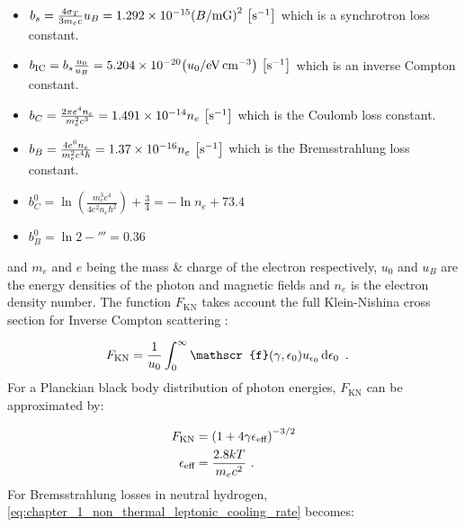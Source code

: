 \begin{itemize}[noitemsep]
	\item $b_s=\frac{4\sigma_T}{3m_ec}u_B=1.292\times 10^{-15}\qty(B/\si{\milli G})^2~\qty[\persec]$ which is a synchrotron loss constant.
	\item $b_\text{IC}=b_s\frac{u_0}{u_B}=5.204\times 10^{-20}\qty(u_0/\si{\electronvolt\per\centi\meter\cubed})~\qty[\persec]$ which is an inverse Compton constant.
	\item $b_C=\frac{2\pi e^4 n_e}{m_e^2 c^3}=1.491\times 10^{-14}n_e~\qty[\persec]$ which is the Coulomb loss constant.
	\item $b_B=\frac{4e^6 n_e}{m_e^2c^4\hbar}=1.37\times 10^{-16}n_e~\qty[\persec]$ which is the Bremsstrahlung loss constant.
	\item $b_C^0=\ln(\frac{m_e^3c^4}{4e^2n_e\hbar^2})+\frac{3}{4}=-\ln n_e+73.4$
	\item $b_B^0=\ln 2-\third=0.36$
\end{itemize}
\noindent and $m_e$ and $e$ being the mass \& charge of the electron respectively, $u_0$ and $u_B$ are the energy densities of the photon and magnetic fields and $n_e$ is the electron density number. The function $F_\text{KN}$ takes account the full Klein-Nishina cross section for Inverse Compton scattering \citep{2007A&A...474..689M}:

\begin{equation}
	\begin{split}
		F_\text{KN}&=\frac{1}{u_0}\int_{0}^\infty \mathscr{f}\qty(\gamma,\epsilon_0)u_{\epsilon_0}\dd{\epsilon_0} \text{ .}
	\end{split}
\end{equation}
\noindent For a Planckian black body distribution of photon energies, $F_\text{KN}$ can be approximated by:

\begin{equation}
    \begin{aligned}
    F_\text{KN}&=\qty(1+4\gamma \epsilon_\text{eff})^{-3/2} \\
    \epsilon_\text{eff}&=\frac{2.8kT}{m_ec^2}\text{ .}
    \end{aligned}
\end{equation}
\noindent For Bremsstrahlung losses in neutral hydrogen, \autoref{eq:chapter_1_non_thermal_leptonic_cooling_rate} becomes:

